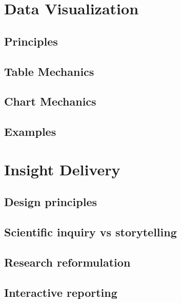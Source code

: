 \documentclass[
]{book}
\begin{document}
\hypertarget{data_viz}{%
\chapter{Data Visualization}\label{data_viz}}

\hypertarget{principles}{%
\section{Principles}\label{principles}}

\hypertarget{table-mechanics}{%
\section{Table Mechanics}\label{table-mechanics}}

\hypertarget{chart-mechanics}{%
\section{Chart Mechanics}\label{chart-mechanics}}

\hypertarget{examples}{%
\section{Examples}\label{examples}}

\hypertarget{insight_delivery}{%
\chapter{Insight Delivery}\label{insight_delivery}}

\hypertarget{design-principles}{%
\section{Design principles}\label{design-principles}}

\hypertarget{scientific-inquiry-vs-storytelling}{%
\section{Scientific inquiry vs storytelling}\label{scientific-inquiry-vs-storytelling}}

\hypertarget{research-reformulation}{%
\section{Research reformulation}\label{research-reformulation}}

\hypertarget{interactive-reporting}{%
\section{Interactive reporting}\label{interactive-reporting}}
\end{document}
